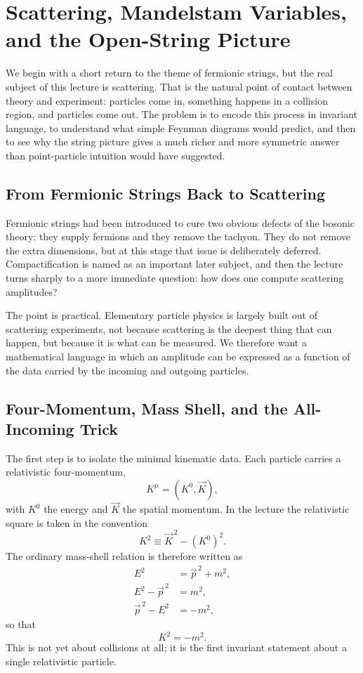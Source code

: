\chapter{Scattering, Mandelstam Variables, and the Open-String Picture}

We begin with a short return to the theme of fermionic strings, but the real subject of this lecture is scattering. That is the natural point of contact between theory and experiment: particles come in, something happens in a collision region, and particles come out. The problem is to encode this process in invariant language, to understand what simple Feynman diagrams would predict, and then to see why the string picture gives a much richer and more symmetric answer than point-particle intuition would have suggested.

\section{From Fermionic Strings Back to Scattering}

Fermionic strings had been introduced to cure two obvious defects of the bosonic theory: they supply fermions and they remove the tachyon. They do not remove the extra dimensions, but at this stage that issue is deliberately deferred. Compactification is named as an important later subject, and then the lecture turns sharply to a more immediate question: how does one compute scattering amplitudes?

The point is practical. Elementary particle physics is largely built out of scattering experiments, not because scattering is the deepest thing that can happen, but because it is what can be measured. We therefore want a mathematical language in which an amplitude can be expressed as a function of the data carried by the incoming and outgoing particles.

\section{Four-Momentum, Mass Shell, and the All-Incoming Trick}

The first step is to isolate the minimal kinematic data. Each particle carries a relativistic four-momentum,
\begin{equation}
K^\mu = (K^0,\vec K),
\end{equation}
with \(K^0\) the energy and \(\vec K\) the spatial momentum. In the lecture the relativistic square is taken in the convention
\begin{equation}
K^2 \equiv \vec K^{\,2} - (K^0)^2.
\end{equation}
The ordinary mass-shell relation is therefore written as
\begin{align}
E^2 &= \vec p^{\,2}+m^2,\\
E^2-\vec p^{\,2} &= m^2,\\
\vec p^{\,2}-E^2 &= -m^2,
\end{align}
so that
\begin{equation}
K^2 = -m^2.
\end{equation}
This is not yet about collisions at all; it is the first invariant statement about a single relativistic particle.

